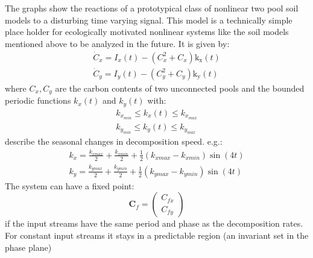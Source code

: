 \begin{minipage}[height=\columnheight]{\textwidth}
\begin{multicols*}{3}
\begin{itemize}
  \end{itemize}
The graphs show the reactions of a prototypical class of nonlinear two pool soil models to a disturbing time varying signal. 
This model is a technically simple place holder for ecologically motivated nonlinear systems like the soil models mentioned above to be analyzed in the future. It is given by:\\
\begin{eqnarray}
\dot{C}_x=I_{x}(t)  - \left(C_{x}^{2} + C_{x}\right) \operatorname{k_{x}}{\left (t \right )}\\
\dot{C}_y=I_{y}(t)  - \left(C_{y}^{2} + C_{y}\right) \operatorname{k_{y}}{\left (t \right )}
\end{eqnarray}
where $C_x,C_y$ are the carbon contents of two unconnected pools and the bounded  periodic functions $k_x(t) $ and $k_y(t) $ with:\\ 
\begin{eqnarray}
k_{x_{min}}\le  k_x(t) \le k_{x_{max}} \\k_{y_{min}} \le  k_y(t) \le k_{y_{max}}
\end{eqnarray}
describe the seasonal changes in decomposition speed.
e.g.:\\ 
\begin{eqnarray}
k_x=\frac{k_{xmax}}{2} + \frac{k_{xmin}}{2} + \frac{1}{2} \left(k_{xmax} - k_{xmin}\right) \sin{\left (4 t \right )}\\k_y=\frac{k_{ymax}}{2} + \frac{k_{ymin}}{2} + \frac{1}{2} \left(k_{ymax} - k_{ymin}\right) \sin{\left (4 t \right )}
\end{eqnarray}
The system can have a fixed point: 
$$ \mathbf{C}_f= \begin{pmatrix} C_{fx} \\ C_{fy} \end{pmatrix} $$
if the input streams have the same period and phase as the decomposition rates. For constant input streams it stays in a predictable region (an invariant set in the phase plane) \\ 

\end{multicols*}
\end{minipage}
